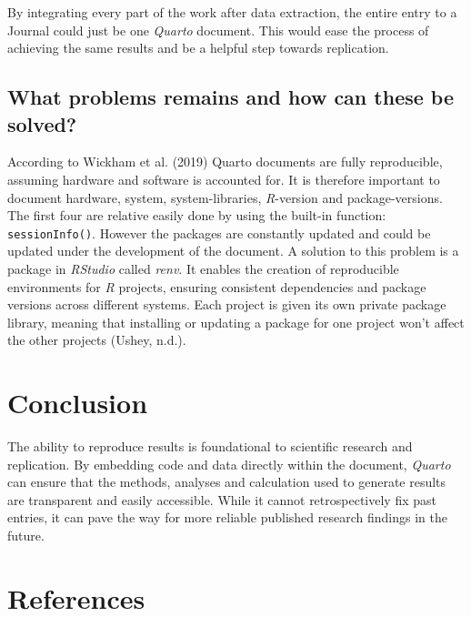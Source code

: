 \documentclass[
  a4paper,
]{article}
\begin{document}
By integrating every part of the work after data extraction, the entire
entry to a Journal could just be one \emph{Quarto} document. This would
ease the process of achieving the same results and be a helpful step
towards replication.

\subsection{What problems remains and how can these be
solved?}\label{what-problems-remains-and-how-can-these-be-solved}

According to Wickham et al. (2019) Quarto documents are fully
reproducible, assuming hardware and software is accounted for. It is
therefore important to document hardware, system, system-libraries,
\emph{R}-version and package-versions. The first four are relative
easily done by using the built-in function: \texttt{sessionInfo()}.
However the packages are constantly updated and could be updated under
the development of the document. A solution to this problem is a package
in \emph{RStudio} called \emph{renv}. It enables the creation of
reproducible environments for \emph{R} projects, ensuring consistent
dependencies and package versions across different systems. Each project
is given its own private package library, meaning that installing or
updating a package for one project won't affect the other projects
(Ushey, n.d.).

\section{Conclusion}\label{conclusion}

The ability to reproduce results is foundational to scientific research
and replication. By embedding code and data directly within the
document, \emph{Quarto} can ensure that the methods, analyses and
calculation used to generate results are transparent and easily
accessible. While it cannot retrospectively fix past entries, it can
pave the way for more reliable published research findings in the
future.

\section*{References}\label{references}
\end{document}
